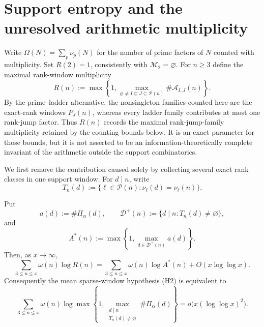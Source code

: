 \section{Support entropy and the unresolved arithmetic multiplicity}
\label{sec:growth}

Write $\Omega(N)=\sum_p\nu_p(N)$ for the number of prime factors of $N$
counted with multiplicity. Set $R(2)=1$, consistently with
$\mathcal M_2=\varnothing$. For $n\ge3$ define the maximal rank-window
multiplicity
\begin{equation}\label{eq:rank-window-multiplicity}
 R(n):=\max\!\left\{1,
 \max_{\varnothing\ne I\subseteq J\subseteq\mathcal P(n)}
       \#\mathcal A_{I,J}(n)\right\}.
\end{equation}
By the prime--ladder alternative, the nonsingleton families counted here are the
exact-rank windows $P_J(n)$, whereas every ladder family contributes at most
one rank-jump factor. Thus $R(n)$ records the maximal rank-jump-family multiplicity retained
by the counting bounds below. It is an exact parameter for those bounds, but
it is not asserted to be an information-theoretically complete invariant of
the arithmetic outside the support combinatorics.

We first remove the contribution caused solely by collecting several exact
rank classes in one support window. For $d\mid n$, write
\[
 T_n(d):=\{\ell\in\mathcal P(n):
 \nu_\ell(d)=\nu_\ell(n)\}.
\]

\begin{theorem}
\label{thm:mean-rank-window-deaggregation}
Put
\[
 a(d):=\#\Pi_\alpha(d),\qquad
 \mathcal D^+(n):=\{d\mid n:T_n(d)\ne\varnothing\},
\]
and
\[
 A^*(n):=\max\left\{1,\max_{d\in\mathcal D^+(n)}a(d)\right\}.
\]
Then, as $x\to\infty$,
\begin{equation}\label{eq:mean-window-deaggregation}
 \sum_{3\le n\le x}\omega(n)\log R(n)
 =\sum_{3\le n\le x}\omega(n)\log A^*(n)
 +O(x\log\log x).
\end{equation}
Consequently the mean sparse-window hypothesis \textup{(H2)} is equivalent to
\begin{equation}\label{eq:visible-single-rank-interface}
 \sum_{3\le n\le x}\omega(n)
 \log\max\left\{1,
 \max_{\substack{d\mid n\\T_n(d)\ne\varnothing}}
 \#\Pi_\alpha(d)\right\}
 =o\bigl(x(\log\log x)^2\bigr).
\end{equation}
\end{theorem}

